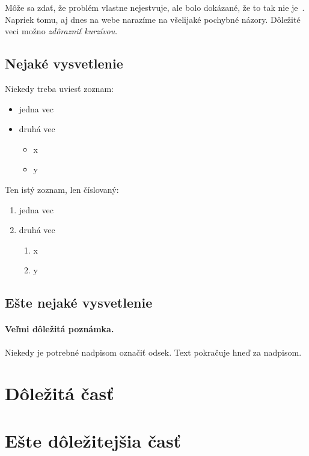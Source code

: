 \documentclass[10pt,twocolumn,twoside,slovak,a4paper]{article}
\begin{document}
Môže sa zdať, že problém vlastne nejestvuje\cite{Coplien:MPD}, ale bolo dokázané, že to tak nie je~\cite{Czarnecki:Staged, Czarnecki:Progress}. Napriek tomu, aj dnes na webe narazíme na všelijaké pochybné názory\cite{PLP-Framework}. Dôležité veci možno \emph{zdôrazniť kurzívou}.


\subsection{Nejaké vysvetlenie} \label{ina:nejake}

Niekedy treba uviesť zoznam:

\begin{itemize}
\item jedna vec
\item druhá vec
	\begin{itemize}
	\item x
	\item y
	\end{itemize}
\end{itemize}

Ten istý zoznam, len číslovaný:

\begin{enumerate}
\item jedna vec
\item druhá vec
	\begin{enumerate}
	\item x
	\item y
	\end{enumerate}
\end{enumerate}


\subsection{Ešte nejaké vysvetlenie} \label{ina:este}

\paragraph{Veľmi dôležitá poznámka.}
Niekedy je potrebné nadpisom označiť odsek. Text pokračuje hneď za nadpisom.



\section{Dôležitá časť} \label{dolezita}




\section{Ešte dôležitejšia časť} \label{dolezitejsia}
\end{document}
